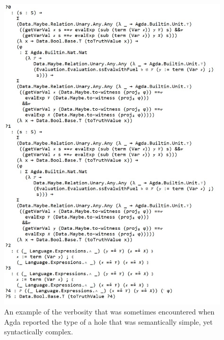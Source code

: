 \documentclass[oneside,12pt]{article}
\begin{document}
\begin{figure}
  \caption{An example of the verbosity that was sometimes encountered when Agda reported the type of a hole that was semantically simple, yet syntactically complex.}
  \label{fig:verbosity}
  \vspace*{\fill}
  \begin{centering}
    \includegraphics[scale=0.50]{./Figures/verbosity}
  \end{centering}
  \vspace*{\fill}
  
\end{figure}
\end{document}
